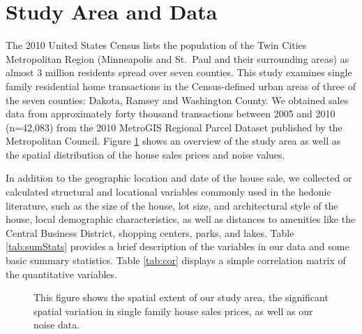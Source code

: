 \documentclass[leqno]{article}\usepackage[]{graphicx}\usepackage[]{color}
\begin{document}
\section{Study Area and Data}
The 2010 United States Census lists the population of the Twin Cities Metropolitan Region (Minneapolis and St.\ Paul and their surrounding areas) as almost 3 million residents spread over seven counties. This study examines single family residential home transactions in the Census-defined urban areas of three of the seven counties: Dakota, Ramsey and Washington County. We obtained sales data from approximately forty thousand transactions between 2005 and 2010 (n=42,083) from the 2010 MetroGIS Regional Parcel Dataset published by the Metropolitan Council. Figure \ref{fig:overview} shows an overview of the study area as well as the spatial distribution of the house sales prices and noise values. 

In addition to the geographic location and date of the house sale, we collected or calculated structural and locational variables commonly used in the hedonic literature, such as the size of the house, lot size, and architectural style of the house, local demographic characteristics, as well as distances to amenities like the Central Business District, shopping centers, parks, and lakes. Table \ref{tab:sumStats} provides a brief description of the variables in our data and some basic summary statistics. Table \ref{tab:cor} displays a simple correlation matrix of the quantitative variables.

\begin{figure}
\caption{This figure shows the spatial extent of our study area, the significant spatial variation in single family house sales prices, as well as our noise data.}
\label{fig:overview}
\end{figure}
\end{document}
